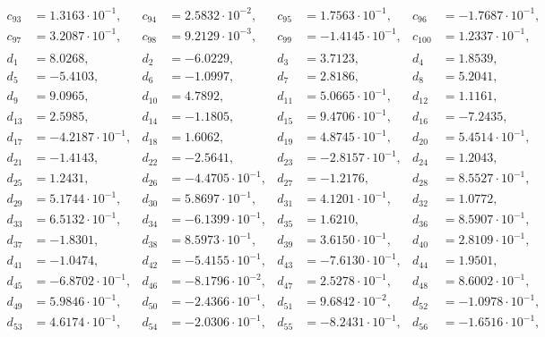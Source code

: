 \begin{align*}
c_{ 93 } &= 1.3163 \cdot 10^{ -1 }, & c_{ 94 } &= 2.5832 \cdot 10^{ -2 }, & c_{ 95 } &= 1.7563 \cdot 10^{ -1 }, & c_{ 96 } &= -1.7687 \cdot 10^{ -1 },\\ 
c_{ 97 } &= 3.2087 \cdot 10^{ -1 }, & c_{ 98 } &= 9.2129 \cdot 10^{ -3 }, & c_{ 99 } &= -1.4145 \cdot 10^{ -1 }, & c_{ 100 } &= 1.2337 \cdot 10^{ -1 },\\ 
&&&&&&& \\ 
d_{ 1 } &= 8.0268, & d_{ 2 } &= -6.0229, & d_{ 3 } &= 3.7123, & d_{ 4 } &= 1.8539,\\ 
d_{ 5 } &= -5.4103, & d_{ 6 } &= -1.0997, & d_{ 7 } &= 2.8186, & d_{ 8 } &= 5.2041,\\ 
d_{ 9 } &= 9.0965, & d_{ 10 } &= 4.7892, & d_{ 11 } &= 5.0665 \cdot 10^{ -1 }, & d_{ 12 } &= 1.1161,\\ 
d_{ 13 } &= 2.5985, & d_{ 14 } &= -1.1805, & d_{ 15 } &= 9.4706 \cdot 10^{ -1 }, & d_{ 16 } &= -7.2435,\\ 
d_{ 17 } &= -4.2187 \cdot 10^{ -1 }, & d_{ 18 } &= 1.6062, & d_{ 19 } &= 4.8745 \cdot 10^{ -1 }, & d_{ 20 } &= 5.4514 \cdot 10^{ -1 },\\ 
d_{ 21 } &= -1.4143, & d_{ 22 } &= -2.5641, & d_{ 23 } &= -2.8157 \cdot 10^{ -1 }, & d_{ 24 } &= 1.2043,\\ 
d_{ 25 } &= 1.2431, & d_{ 26 } &= -4.4705 \cdot 10^{ -1 }, & d_{ 27 } &= -1.2176, & d_{ 28 } &= 8.5527 \cdot 10^{ -1 },\\ 
d_{ 29 } &= 5.1744 \cdot 10^{ -1 }, & d_{ 30 } &= 5.8697 \cdot 10^{ -1 }, & d_{ 31 } &= 4.1201 \cdot 10^{ -1 }, & d_{ 32 } &= 1.0772,\\ 
d_{ 33 } &= 6.5132 \cdot 10^{ -1 }, & d_{ 34 } &= -6.1399 \cdot 10^{ -1 }, & d_{ 35 } &= 1.6210, & d_{ 36 } &= 8.5907 \cdot 10^{ -1 },\\ 
d_{ 37 } &= -1.8301, & d_{ 38 } &= 8.5973 \cdot 10^{ -1 }, & d_{ 39 } &= 3.6150 \cdot 10^{ -1 }, & d_{ 40 } &= 2.8109 \cdot 10^{ -1 },\\ 
d_{ 41 } &= -1.0474, & d_{ 42 } &= -5.4155 \cdot 10^{ -1 }, & d_{ 43 } &= -7.6130 \cdot 10^{ -1 }, & d_{ 44 } &= 1.9501,\\ 
d_{ 45 } &= -6.8702 \cdot 10^{ -1 }, & d_{ 46 } &= -8.1796 \cdot 10^{ -2 }, & d_{ 47 } &= 2.5278 \cdot 10^{ -1 }, & d_{ 48 } &= 8.6002 \cdot 10^{ -1 },\\ 
d_{ 49 } &= 5.9846 \cdot 10^{ -1 }, & d_{ 50 } &= -2.4366 \cdot 10^{ -1 }, & d_{ 51 } &= 9.6842 \cdot 10^{ -2 }, & d_{ 52 } &= -1.0978 \cdot 10^{ -1 },\\ 
d_{ 53 } &= 4.6174 \cdot 10^{ -1 }, & d_{ 54 } &= -2.0306 \cdot 10^{ -1 }, & d_{ 55 } &= -8.2431 \cdot 10^{ -1 }, & d_{ 56 } &= -1.6516 \cdot 10^{ -1 },\\ 

\end{align*}
